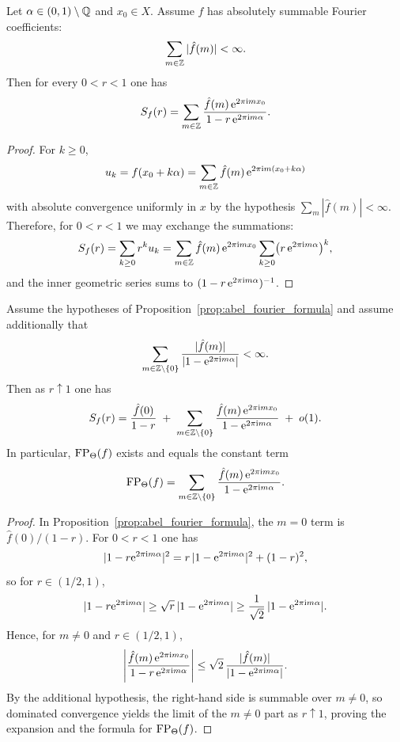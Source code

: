 \begin{proposition}
\label{prop:abel_fourier_formula}
Let $\alpha\in(0,1)\setminus\mathbb{Q}$ and $x_0\in X$.
Assume $f$ has absolutely summable Fourier coefficients:
$$
\sum_{m\in\mathbb{Z}}|\hat f(m)|<\infty.
$$
Then for every $0<r<1$ one has
$$
S_f(r)=\sum_{m\in\mathbb{Z}}\frac{\hat f(m)\,\mathrm{e}^{2\pi\mathrm{i} m x_0}}{1-r\,\mathrm{e}^{2\pi\mathrm{i} m\alpha}}.
$$
\end{proposition}

\begin{proof}
For $k\ge 0$,
$$
u_k=f(x_0+k\alpha)=\sum_{m\in\mathbb{Z}}\hat f(m)\,\mathrm{e}^{2\pi\mathrm{i} m (x_0+k\alpha)}
$$
with absolute convergence uniformly in $x$ by the hypothesis $\sum_m|\hat f(m)|<\infty$.
Therefore, for $0<r<1$ we may exchange the summations:
$$
S_f(r)=\sum_{k\ge 0}r^k u_k
=\sum_{m\in\mathbb{Z}}\hat f(m)\,\mathrm{e}^{2\pi\mathrm{i} m x_0}\sum_{k\ge 0}\bigl(r\,\mathrm{e}^{2\pi\mathrm{i} m\alpha}\bigr)^k,
$$
and the inner geometric series sums to $(1-r\,\mathrm{e}^{2\pi\mathrm{i} m\alpha})^{-1}$.
\end{proof}

\begin{corollary}
\label{cor:abel_fp_fourier}
Assume the hypotheses of Proposition~\ref{prop:abel_fourier_formula} and assume additionally that
$$
\sum_{m\in\mathbb{Z}\setminus\{0\}}\frac{|\hat f(m)|}{|1-\mathrm{e}^{2\pi\mathrm{i} m\alpha}|}<\infty.
$$
Then as $r\uparrow 1$ one has
$$
S_f(r)=\frac{\hat f(0)}{1-r}
\;+\;
\sum_{m\in\mathbb{Z}\setminus\{0\}}\frac{\hat f(m)\,\mathrm{e}^{2\pi\mathrm{i} m x_0}}{1-\mathrm{e}^{2\pi\mathrm{i} m\alpha}}
\;+\;o(1).
$$
In particular, $\mathrm{FP}_\Theta(f)$ exists and equals the constant term
$$
\mathrm{FP}_\Theta(f)=\sum_{m\in\mathbb{Z}\setminus\{0\}}\frac{\hat f(m)\,\mathrm{e}^{2\pi\mathrm{i} m x_0}}{1-\mathrm{e}^{2\pi\mathrm{i} m\alpha}}.
$$
\end{corollary}

\begin{proof}
In Proposition~\ref{prop:abel_fourier_formula}, the $m=0$ term is $\hat f(0)/(1-r)$.
For $0<r<1$ one has
$$
|1-r\mathrm{e}^{2\pi\mathrm{i} m\alpha}|^2=r\,|1-\mathrm{e}^{2\pi\mathrm{i} m\alpha}|^2+(1-r)^2,
$$
so for $r\in(1/2,1)$,
$$
|1-r\mathrm{e}^{2\pi\mathrm{i} m\alpha}|\ge \sqrt{r}\,|1-\mathrm{e}^{2\pi\mathrm{i} m\alpha}|\ge \frac{1}{\sqrt{2}}\,|1-\mathrm{e}^{2\pi\mathrm{i} m\alpha}|.
$$
Hence, for $m\ne 0$ and $r\in(1/2,1)$,
$$
\left|\frac{\hat f(m)\,\mathrm{e}^{2\pi\mathrm{i} m x_0}}{1-r\,\mathrm{e}^{2\pi\mathrm{i} m\alpha}}\right|
\le \sqrt{2}\,\frac{|\hat f(m)|}{|1-\mathrm{e}^{2\pi\mathrm{i} m\alpha}|}.
$$
By the additional hypothesis, the right-hand side is summable over $m\ne 0$, so dominated convergence yields the limit of the $m\ne 0$ part as $r\uparrow 1$, proving the expansion and the formula for $\mathrm{FP}_\Theta(f)$.
\end{proof}

